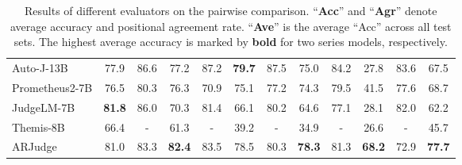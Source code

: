 \begin{table*}[ht!]
{\begin{tabular}{@{}lccccccccccc@{}}
Auto-J-13B              & 77.9            & 86.6            & 77.2            & 87.2           & \textbf{79.7}  & 87.5           & 75.0         & 84.2         & 27.8               & 83.6 & 67.5        \\
Prometheus2-7B          & 76.5            & 80.3            & 76.3            & 70.9           & 75.1           & 77.2           & 74.3         & 79.5         & 41.5               & 77.6 & 68.7        \\
JudgeLM-7B              & \textbf{81.8}   & 86.0            & 70.3            & 81.4           & 66.1           & 80.2           & 64.6         & 77.1         & 28.1               & 82.0 & 62.2        \\
Themis-8B               & 66.4            & -               & 61.3            & -              & 39.2           & -              & 34.9         & -            & 26.6               & -    & 45.7        \\
ARJudge                 & 81.0            & 83.3            & \textbf{82.4}   & 83.5           & 78.5           & 80.3           & \textbf{78.3}& 81.3         & \textbf{68.2}      & 72.9 & \textbf{77.7}  \\ \bottomrule
\end{tabular}
    }
\caption{Results of different evaluators on the pairwise comparison. ``\textbf{Acc}'' and ``\textbf{Agr}'' denote average accuracy and positional agreement rate. ``\textbf{Ave}'' is the average ``Acc'' across all test sets. The highest average accuracy is marked by \textbf{bold} for two series models, respectively.}
\label{main_result}
\end{table*}

